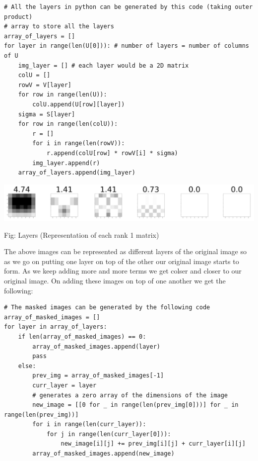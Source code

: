 \documentclass{article}
\begin{document}
\begin{verbatim}
# All the layers in python can be generated by this code (taking outer product)
# array to store all the layers
array_of_layers = []
for layer in range(len(U[0])): # number of layers = number of columns of U
    img_layer = [] # each layer would be a 2D matrix
    colU = []
    rowV = V[layer]
    for row in range(len(U)):
        colU.append(U[row][layer])
    sigma = S[layer]
    for row in range(len(colU)):
        r = []
        for i in range(len(rowV)):
            r.append(colU[row] * rowV[i] * sigma)
        img_layer.append(r)
    array_of_layers.append(img_layer)
\end{verbatim}

\begin{center}
    \includegraphics[width=16.5cm]{components.png}
\end{center}

\begin{center}
    Fig: Layers (Representation of each rank 1 matrix)
\end{center}

The above images can be represented as different layers of the original image so as we go on putting one layer on top of the other our original image starts to form. As we keep adding more and more terms we get colser and closer to our original image. On adding these images on top of one another we get the following:

\begin{verbatim}
# The masked images can be generated by the following code
array_of_masked_images = []
for layer in array_of_layers:
    if len(array_of_masked_images) == 0:
        array_of_masked_images.append(layer)
        pass
    else:
        prev_img = array_of_masked_images[-1]
        curr_layer = layer
        # generates a zero array of the dimensions of the image
        new_image = [[0 for _ in range(len(prev_img[0]))] for _ in range(len(prev_img))]
        for i in range(len(curr_layer)):
            for j in range(len(curr_layer[0])):
                new_image[i][j] += prev_img[i][j] + curr_layer[i][j]
        array_of_masked_images.append(new_image)
\end{verbatim}
\end{document}
